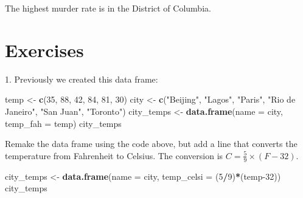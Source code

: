 \documentclass[
]{krantz}
\newenvironment{Shaded}{\begin{snugshade}}{\end{snugshade}}
\newcommand{\CommentTok}[1]{\textcolor[rgb]{0.37,0.37,0.37}{\textit{#1}}}
\newcommand{\DataTypeTok}[1]{\textcolor[rgb]{0.27,0.27,0.27}{#1}}
\newcommand{\DecValTok}[1]{\textcolor[rgb]{0.06,0.06,0.06}{#1}}
\newcommand{\KeywordTok}[1]{\textcolor[rgb]{0.27,0.27,0.27}{\textbf{#1}}}
\newcommand{\NormalTok}[1]{#1}
\newcommand{\OperatorTok}[1]{\textcolor[rgb]{0.43,0.43,0.43}{\textbf{#1}}}
\newcommand{\OtherTok}[1]{\textcolor[rgb]{0.37,0.37,0.37}{#1}}
\newcommand{\StringTok}[1]{\textcolor[rgb]{0.5,0.5,0.5}{#1}}
\begin{document}
\begin{Shaded}
\end{Shaded}

The highest murder rate is in the District of Columbia.

\hypertarget{exercises-4}{%
\section{Exercises}\label{exercises-4}}

1. Previously we created this data frame:

\begin{Shaded}
\begin{Highlighting}[]
\NormalTok{temp <-}\StringTok{ }\KeywordTok{c}\NormalTok{(}\DecValTok{35}\NormalTok{, }\DecValTok{88}\NormalTok{, }\DecValTok{42}\NormalTok{, }\DecValTok{84}\NormalTok{, }\DecValTok{81}\NormalTok{, }\DecValTok{30}\NormalTok{)}
\NormalTok{city <-}\StringTok{ }\KeywordTok{c}\NormalTok{(}\StringTok{"Beijing"}\NormalTok{, }\StringTok{"Lagos"}\NormalTok{, }\StringTok{"Paris"}\NormalTok{, }\StringTok{"Rio de Janeiro"}\NormalTok{, }
          \StringTok{"San Juan"}\NormalTok{, }\StringTok{"Toronto"}\NormalTok{)}
\NormalTok{city_temps <-}\StringTok{ }\KeywordTok{data.frame}\NormalTok{(}\DataTypeTok{name =}\NormalTok{ city, }\DataTypeTok{temp_fah =}\NormalTok{ temp)}
\NormalTok{city_temps}
\end{Highlighting}
\end{Shaded}

Remake the data frame using the code above, but add a line that converts the temperature from Fahrenheit to Celsius. The conversion is \(C = \frac{5}{9} \times (F - 32)\).

\begin{Shaded}
\begin{Highlighting}[]
\NormalTok{city_temps <-}\StringTok{ }\KeywordTok{data.frame}\NormalTok{(}\DataTypeTok{name =}\NormalTok{ city, }\DataTypeTok{temp_celsi =}\NormalTok{ (}\DecValTok{5}\OperatorTok{/}\DecValTok{9}\NormalTok{)}\OperatorTok{*}\NormalTok{(temp}\DecValTok{-32}\NormalTok{))}
\NormalTok{city_temps}
\end{Highlighting}
\end{Shaded}
\end{document}
